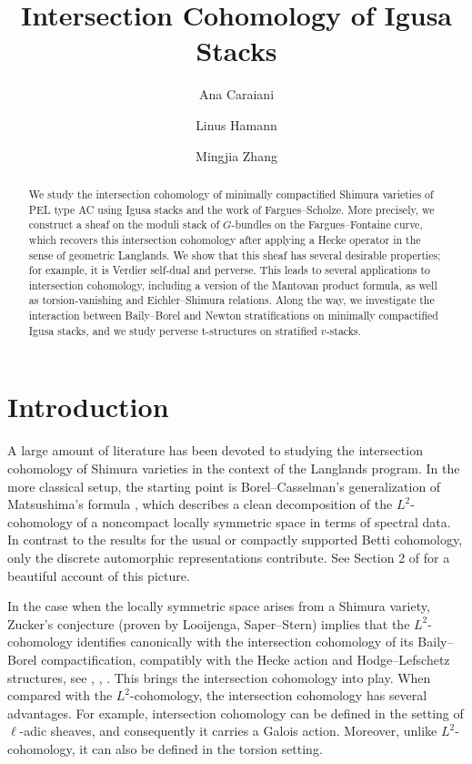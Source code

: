 \documentclass[letterpaper,11pt]{amsart}
\title{Intersection Cohomology of Igusa Stacks}
\author{Ana Caraiani}
\author{Linus Hamann}
\author{Mingjia Zhang}
\begin{document}
\begin{abstract} We study the intersection cohomology of minimally compactified Shimura varieties of PEL type AC using Igusa stacks and the work of Fargues--Scholze. More precisely, we construct a sheaf on the moduli stack of $G$-bundles on the Fargues--Fontaine curve, which recovers this intersection cohomology after applying a Hecke operator in the sense of geometric Langlands. We show that this sheaf has several desirable properties; for example, it is Verdier self-dual and perverse. This leads to several applications to intersection cohomology, including a version of the Mantovan product formula, as well as torsion-vanishing and Eichler--Shimura relations. Along the way, we investigate the interaction between Baily--Borel and Newton stratifications on minimally compactified Igusa stacks, and we study perverse t-structures on stratified $v$-stacks.
\end{abstract}
\maketitle
\tableofcontents
\section{Introduction}

A large amount of literature has been devoted to studying the intersection cohomology of Shimura varieties in the context of the Langlands program. In the more classical setup, the starting point is Borel--Casselman's generalization of Matsushima's formula \cite{BorelCasselman}, which describes a clean decomposition of the $L^2$-cohomology of a noncompact locally symmetric space in terms of spectral data. In contrast to the results for the usual or compactly supported Betti cohomology, only the discrete automorphic representations contribute. See Section 2 of \cite{ArthurClay96} for a beautiful account of this picture. 

In the case when the locally symmetric space arises from a Shimura variety, Zucker's conjecture (proven by Looijenga, Saper--Stern) implies that the $L^2$-cohomology identifies canonically with the intersection cohomology of its Baily--Borel compactification, compatibly with the Hecke action and Hodge--Lefschetz structures, see \cite{Looijenga88}, \cite{SaperStern}, \cite{Looijenga25}. This brings the intersection cohomology into play. When compared with the $L^2$-cohomology, the intersection cohomology has several advantages. For example, intersection cohomology can be defined in the setting of $\ell$-adic sheaves, and consequently it carries a Galois action. Moreover, unlike $L^{2}$-cohomology, it can also be defined in the torsion setting. 
\end{document}

